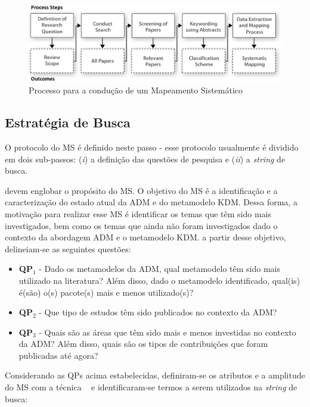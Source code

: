 \begin{figure}[h]
 \caption{Processo para a condução de um Mapeamento Sistemático}
 \label{fig:all_steps_MS}
 \centering
 \includegraphics[scale=0.3]{images/systematic_mapping_process}
\end{figure}

\subsection{Estratégia de Busca}

O protocolo do MS é definido neste passo - esse protocolo usualmente é dividido em dois sub-passos: (\textit{i}) a definição das questões de pesquisa e (\textit{ii}) a \textit{string} de busca. 

 devem englobar o propósito do MS. O objetivo do MS é a identificação e a caracterização do estado atual da ADM e do metamodelo KDM. Dessa forma, a motivação para realizar esse MS é identificar os temas que têm sido mais investigados, bem como os temas que ainda não foram investigados dado o contexto da abordagem ADM e o metamodelo KDM. a partir desse objetivo, delineiam-se as seguintes questões:

\begin{itemize}
\item \textbf{QP$_1$} - Dado os metamodelos da ADM, qual metamodelo têm sido mais utilizado na literatura? Além disso, dado o metamodelo identificado, qual(is) é(são) o(s) pacote(s) mais e menos utilizado(s)?
\item \textbf{QP$_2$} - Que tipo de estudos têm sido publicados no contexto da ADM?
\item \textbf{QP$_3$} - Quais são as áreas que têm sido mais e menos investidas no contexto da ADM? Além disso, quais são os tipos de contribuições que foram publicadas até agora?
\end{itemize}

Considerando as QPs acima estabelecidas, definiram-se os atributos e a amplitude do MS com a técnica ~\cite{Kitchenham_2010} e identificaram-se termos a serem utilizados na \textit{string} de busca:

